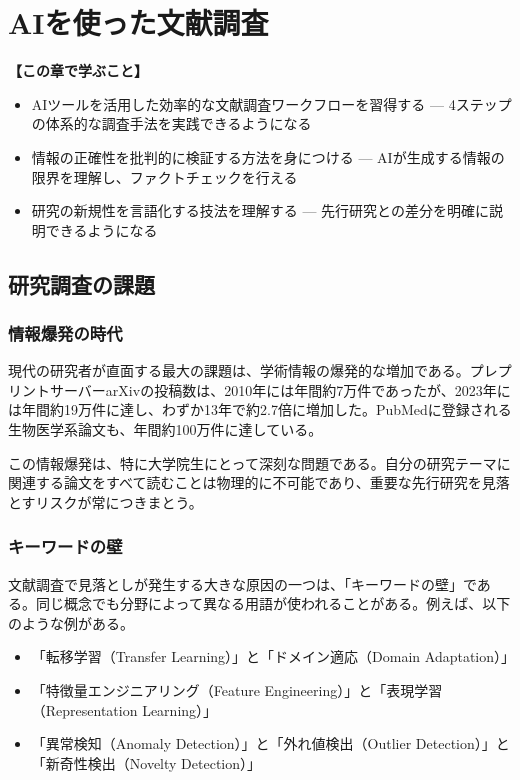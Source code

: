 \chapter{AIを使った文献調査}
\label{chap3}

\begin{chapterbox}
\textbf{【この章で学ぶこと】}
\begin{itemize}
\item AIツールを活用した効率的な文献調査ワークフローを習得する --- 4ステップの体系的な調査手法を実践できるようになる
\item 情報の正確性を批判的に検証する方法を身につける --- AIが生成する情報の限界を理解し、ファクトチェックを行える
\item 研究の新規性を言語化する技法を理解する --- 先行研究との差分を明確に説明できるようになる
\end{itemize}
\end{chapterbox}
\vspace{5mm}

\section{研究調査の課題}
\label{sec:3.1}

\subsection{情報爆発の時代}

現代の研究者が直面する最大の課題は、学術情報の爆発的な増加である。プレプリントサーバーarXivの投稿数は、2010年には年間約7万件であったが、2023年には年間約19万件に達し、わずか13年で約2.7倍に増加した。PubMedに登録される生物医学系論文も、年間約100万件に達している。

この情報爆発は、特に大学院生にとって深刻な問題である。自分の研究テーマに関連する論文をすべて読むことは物理的に不可能であり、重要な先行研究を見落とすリスクが常につきまとう。

\subsection{キーワードの壁}

文献調査で見落としが発生する大きな原因の一つは、「キーワードの壁」である。同じ概念でも分野によって異なる用語が使われることがある。例えば、以下のような例がある。

\begin{itemize}
\item 「転移学習（Transfer Learning）」と「ドメイン適応（Domain Adaptation）」
\item 「特徴量エンジニアリング（Feature Engineering）」と「表現学習（Representation Learning）」
\item 「異常検知（Anomaly Detection）」と「外れ値検出（Outlier Detection）」と「新奇性検出（Novelty Detection）」
\end{itemize}

